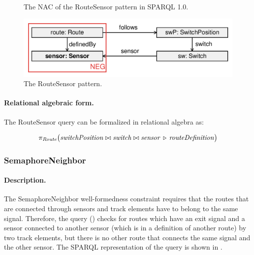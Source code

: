 \begin{figure}[htb]
\centering
\begin{minipage}{0.6\textwidth}
  { \alignListing
    }
  \caption{The NAC of the \textsf{RouteSensor} pattern in SPARQL 1.0.}
  \label{lst:routesensor-sparql-nac10}
\end{minipage}
\end{figure}

\begin{figure}[htb]
		\centering
		\includegraphics[scale=0.4]{figures/pattern-routesensor}
		\caption{The \textsf{RouteSensor} pattern.}
		\label{fig:pattern-routesensor}
\end{figure}

\paragraph{Relational algebraic form.}  The \textsf{RouteSensor} query can be formalized in relational algebra as:

\[
\pi_{\mathit{Route}} \big( \mathit{switchPosition} \bowtie \mathit{switch} \bowtie \mathit{sensor} \, \triangleright \, \mathit{routeDefinition} \big)
\]

\subsubsection{SemaphoreNeighbor}

\paragraph{Description.} The \textsf{SemaphoreNeighbor} well-formedness constraint requires that the routes that are connected through sensors and track elements have to belong to the same signal. Therefore, the query () checks for routes which have an exit signal and a sensor connected to another sensor (which is in a definition of another route) by two track elements, but there is no other route that connects the same signal and the other sensor. The SPARQL representation of the query is shown in .

